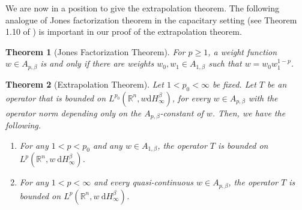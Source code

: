 \documentclass{amsart}
\newtheorem{theorem}{Theorem}
\numberwithin{theorem}{section}
\numberwithin{equation}{section}
\begin{document}
		We are now in a position to give the extrapolation theorem. The following analogue of Jones factorization theorem in the capacitary setting (see Theorem 1.10 of \cite{Huang}) is important in our proof of the extrapolation theorem.
		\begin{theorem}[Jones Factorization Theorem]
			\label{JFT}
			For $p \geq 1$, a weight function $w \in A_{p, \beta}$ is and only if there are weights $w_0, w_1 \in A_{1, \beta}$ such that $w = w_0 w_1^{1 - p}$.
		\end{theorem}
		\begin{theorem}[Extrapolation Theorem]
			\label{ExtrapolationTheorem}
			Let $1 < p_0 < \infty$ be fixed. Let $T$ be an operator that is bounded on $L^{p_0} \left( \mathbb{R}^n, w \mathrm{d}H^{\beta}_{\infty} \right)$, for every $w \in A_{p, \beta}$ with the operator norm depending only on the $A_{p, \beta}$-constant of $w$. Then, we have the following.
			\begin{enumerate}
				\item[(A)] For any $1 < p < p_0$ and any $w \in A_{1, \beta}$, the operator $T$ is bounded on $L^p \left( \mathbb{R}^n, w \ \mathrm{d}H^{\beta}_{\infty} \right)$.
				\item[(B)] For any $1 < p < \infty$ and every quasi-continuous $w \in A_{p, \beta}$, the operator $T$ is bounded on $L^p \left( \mathbb{R}^n, w \ \mathrm{d}H^{\beta}_{\infty} \right)$.
			\end{enumerate}
		\end{theorem}
\end{document}
